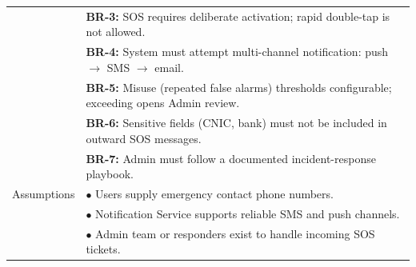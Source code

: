 \begin{longtable}{|>{\raggedright\arraybackslash}p{4cm}|>{\raggedright\arraybackslash}p{11cm}|}
& \textbf{BR-3:} SOS requires deliberate activation; rapid double-tap is not allowed. \\
& \textbf{BR-4:} System must attempt multi-channel notification: push $\rightarrow$ SMS $\rightarrow$ email. \\
& \textbf{BR-5:} Misuse (repeated false alarms) thresholds configurable; exceeding opens Admin review. \\
& \textbf{BR-6:} Sensitive fields (CNIC, bank) must not be included in outward SOS messages. \\
& \textbf{BR-7:} Admin must follow a documented incident-response playbook. \\
\hline
Assumptions & $\bullet$ Users supply emergency contact phone numbers. \\
& $\bullet$ Notification Service supports reliable SMS and push channels. \\
& $\bullet$ Admin team or responders exist to handle incoming SOS tickets. \\
\hline

\end{longtable}

